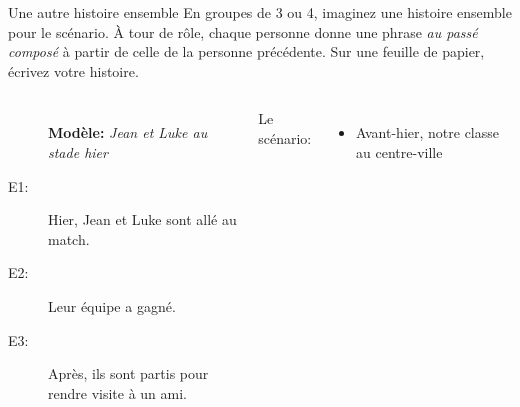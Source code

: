 \begin{frame}{Une autre histoire ensemble}
  En groupes de 3 ou 4, imaginez une histoire ensemble pour le scénario.
  À tour de rôle, chaque personne donne une phrase \emph{au passé composé} à partir de celle de la personne précédente.
  Sur une feuille de papier, écrivez votre histoire. \\
  \begin{columns}
      \small
      \begin{description}
        \item[] \textbf{Modèle:} \emph{Jean et Luke au stade hier}
        \item[E1:] Hier, Jean et Luke sont allé au match.
        \item[E2:] Leur équipe a gagné.
        \item[E3:] Après, ils sont partis pour rendre visite à un ami.
      \end{description}
      \alert{Le scénario:}
      \begin{itemize}
        \item Avant-hier, notre classe au centre-ville
      \end{itemize}
  \end{columns}
\end{frame}